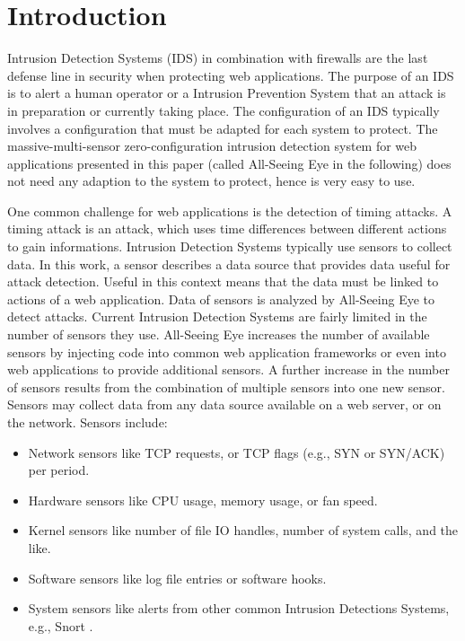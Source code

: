 \documentclass[conference]{IEEEtran}
\begin{document}
\section{Introduction}
Intrusion Detection Systems (IDS) in combination with firewalls are the last defense line in security when protecting web applications. The purpose of an IDS is to alert a human operator or a Intrusion Prevention System that an attack is in preparation or currently taking place. 
The configuration of an IDS typically involves a configuration that must be adapted for each system to protect. 
The massive-multi-sensor zero-configuration intrusion detection system for web applications presented in this paper (called All-Seeing Eye in the following) does not need any adaption to the system to protect, hence is very easy to use.


One common challenge for web applications is the detection of timing attacks. A timing attack is an attack, which uses time differences between different actions to gain informations.
Intrusion Detection Systems typically use sensors to collect data. In this work, a sensor describes a data source that provides data useful for attack detection. Useful in this context means that the data must be linked to actions of a web application. Data of sensors is analyzed by All-Seeing Eye to detect attacks. 
Current Intrusion Detection Systems are fairly limited in the number of sensors they use. All-Seeing Eye increases the number of available sensors by injecting code into common web application frameworks or even into web applications to provide additional sensors. A further increase in the number of sensors results from the combination of multiple sensors into one new sensor.
Sensors may collect data from any data source available on a web server, or on the network. Sensors include:
\begin{itemize}
\item Network sensors like TCP requests, or TCP flags (e.g., SYN or SYN/ACK) per period. 
\item Hardware sensors like CPU usage, memory usage, or fan speed.
\item Kernel sensors like number of file IO handles, number of system calls, and the like.
\item Software sensors like log file entries or software hooks.
\item System sensors like alerts from other common Intrusion Detections Systems, e.g., Snort \cite{snort_2013} .
\end{itemize}
\end{document}
